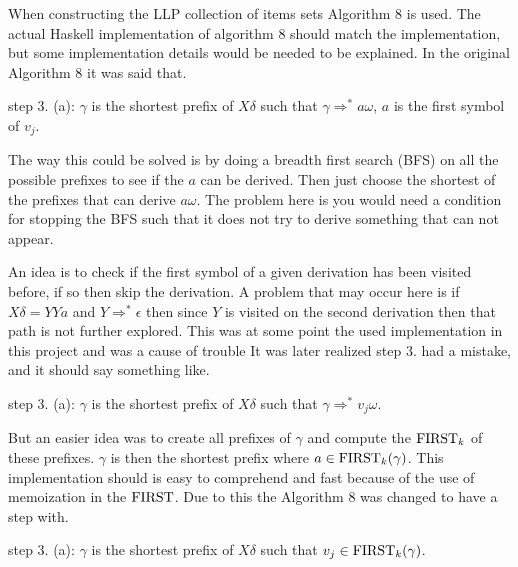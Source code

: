 When constructing the LLP collection of items sets Algorithm 8 \cite[13]{Vagner2007} is used. The actual Haskell implementation of algorithm 8 should match the implementation, but some implementation details would be needed to be explained. In the original Algorithm 8 it was said that. 
\begin{center}
    step 3. (a): $\gamma$ is the shortest prefix of $X\delta$ such that $\gamma \Rightarrow^* a\omega$, $a$ is the first symbol of $v_j$. 
\end{center}
The way this could be solved is by doing a breadth first search (BFS) on all the possible prefixes to see if the $a$ can be derived. Then just choose the shortest of the prefixes that can derive $a\omega$.  The problem here is you would need a condition for stopping the BFS such that it does not try to derive something that can not appear.

An idea is to check if the first symbol of a given derivation has been visited before, if so then skip the derivation. A problem that may occur here is if $X\delta = YYa$ and $Y \Rightarrow^* \epsilon$ then since $Y$ is visited on the second derivation then that path is not further explored. This was at some point the used implementation in this project and was a cause of trouble It was later realized step 3. had a mistake, and it should say something like.
\begin{center}
    step 3. (a): $\gamma$ is the shortest prefix of $X\delta$ such that $\gamma \Rightarrow^* v_j\omega$. 
\end{center}
But an easier idea was to create all prefixes of $\gamma$ and compute the $\text{FIRST}_k$ of these prefixes. $\gamma$ is then the shortest prefix where $a \in \text{FIRST}_k(\gamma)$. This implementation should is easy to comprehend and fast because of the use of memoization in the $\text{FIRST}$. Due to this the Algorithm 8 was changed to have a step with.
\begin{center}
    step 3. (a): $\gamma$ is the shortest prefix of $X\delta$ such that $v_j \in \text{FIRST}_k(\gamma)$. 
\end{center}